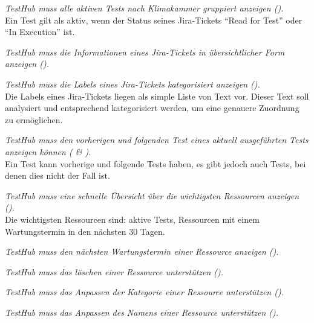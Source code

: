 \begin{description}


    \textit{TestHub muss alle aktiven Tests nach Klimakammer gruppiert anzeigen ().}\\
    Ein Test gilt als aktiv, wenn der Status seines Jira-Tickets ``Read for Test''
    oder ``In Execution'' ist.

    \textit{TestHub muss die Informationen eines Jira-Tickets in übersichtlicher 
    Form anzeigen ().}

    \textit{TestHub muss die Labels eines Jira-Tickets kategorisiert anzeigen ().}\\
    Die Labels eines Jira-Tickets liegen als simple Liste von Text vor. Dieser 
    Text soll analysiert und entsprechend kategorisiert werden, um eine genauere 
    Zuordnung zu ermöglichen.

    \textit{TestHub muss den vorherigen und folgenden Test eines aktuell 
    ausgeführten Tests anzeigen können ( \& ).}\\
    Ein Test kann vorherige und folgende Tests haben, es gibt jedoch auch Tests,
    bei denen dies nicht der Fall ist.    

    \textit{TestHub muss eine schnelle Übersicht über die wichtigsten Ressourcen anzeigen ().}\\
    Die wichtigsten Ressourcen sind: aktive Tests, Ressourcen mit einem Wartungstermin
    in den nächsten 30 Tagen.

    \textit{TestHub muss den nächsten Wartungstermin einer Ressource anzeigen ().}
    
    \textit{TestHub muss das löschen einer Ressource unterstützen ().}
       
    \textit{TestHub muss das Anpassen der Kategorie einer Ressource unterstützen 
    ().}

    \textit{TestHub muss das Anpassen des Namens einer Ressource unterstützen 
    ().}


\end{description}
